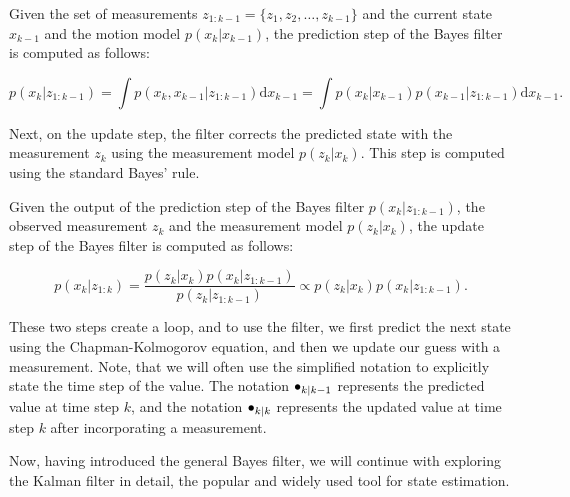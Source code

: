 \begin{theorem}\label{theorem:bayes-filter-predict}\label{theorem:chapman-kolmogorov}
    Given the set of measurements $z_{1:k-1} = \{z_1, z_2, \ldots, z_{k-1}\}$ 
    and the current state $x_{k-1}$ and the motion model $p(x_k | x_{k-1})$, 
    the prediction step of the Bayes filter is computed as follows:

    \begin{equation}
        p\left({x}_k | {z}_{1: k-1}\right)
        = \int 
            p\left(
                {x}_k, {x}_{k-1} | {z}_{1: k-1}
            \right)
            \mathrm{d} {x}_{k-1}
        = \int
            p\left(
                {x}_k | {x}_{k-1}\right
            ) p\left(
                {x}_{k-1} | {z}_{1: k-1}
            \right)
            \mathrm{d} {x}_{k-1}.
    \end{equation}
\end{theorem}

Next, on the update step, the filter corrects the predicted state with the 
measurement $z_k$ using the measurement model $p(z_k | x_k)$. This step is
computed using the standard Bayes' rule.

\begin{theorem}\label{theorem:bayes-filter-update}
    Given the output of the prediction step of the Bayes filter 
    $p\left({x}_k | {z}_{1: k-1}\right)$, the observed measurement $z_k$
    and the measurement model $p(z_k | x_k)$, the update step of the Bayes
    filter is computed as follows:
    
    \begin{equation}
        p\left({x}_k | {z}_{1: k}\right)=\frac{p\left({z}_k | {x}_k\right) p\left({x}_k | {z}_{1: k-1}\right)}{p\left({z}_k | {z}_{1: k-1}\right)} \propto p\left({z}_k | {x}_k\right) p\left({x}_k | {z}_{1: k-1}\right).
    \end{equation}
\end{theorem}

These two steps create a loop, and to use the filter, we first predict the next state using the Chapman-Kolmogorov equation, and then we update our guess with a measurement. Note, that we will often use the simplified notation to explicitly state the time step of the value. The notation $\vecat{\bullet}{k|k-1}$ represents the predicted value at time step $k$, and the notation $\vecat{\bullet}{k|k}$ represents the updated value at time step $k$ after incorporating a measurement.

Now, having introduced the general Bayes filter, we will continue with 
exploring the Kalman filter in detail, the popular and widely used tool for 
state estimation.
